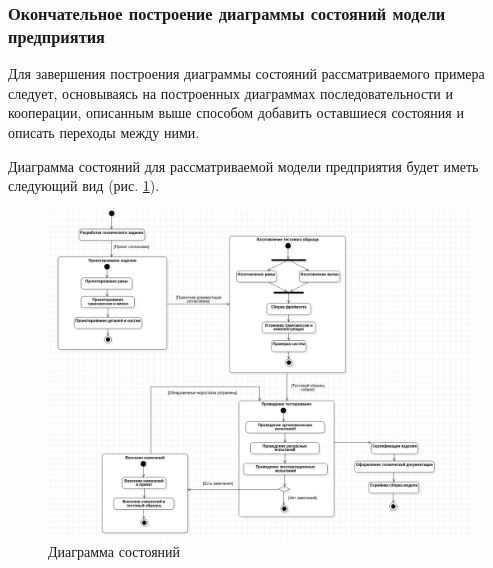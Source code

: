 \documentclass[a4paper,12pt]{report}
\begin{document}
\subsubsection*{Окончательное построение диаграммы состояний модели предприятия}
Для завершения построения диаграммы состояний рассматриваемого примера следует, основываясь на построенных диаграммах последовательности и кооперации, описанным выше способом добавить оставшиеся состояния и описать переходы между ними.

Диаграмма состояний для рассматриваемой модели предприятия будет иметь следующий вид (рис. \ref{fig:statechart}).
\begin{figure}[h!]
	\centering
	\includegraphics[width=1\linewidth]{images/statechart}
	\caption{Диаграмма состояний}
	\label{fig:statechart}
\end{figure}


\newpage
{}
\listoffigures
\newpage
{}
\listoftables
\end{document}
